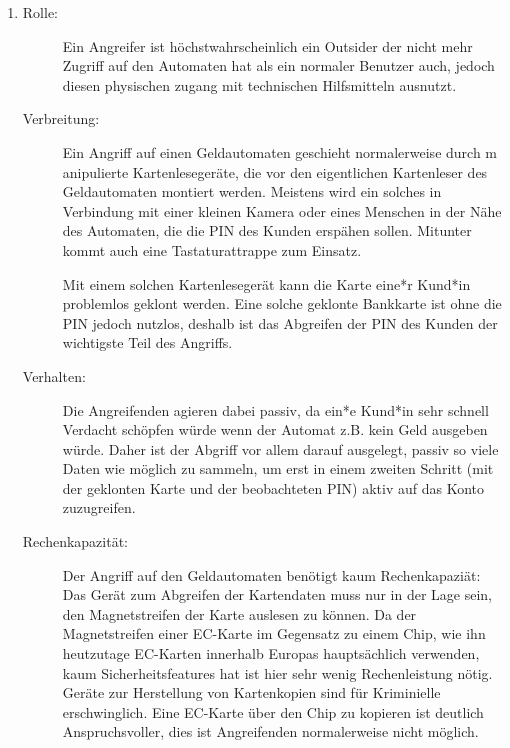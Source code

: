 \documentclass[a4paper,11pt]{scrartcl}
\begin{document}
\begin{enumerate}[1.]
    \item 
        \begin{description}
            \item[Rolle:]
                Ein Angreifer ist höchstwahrscheinlich ein Outsider der nicht 
                mehr Zugriff auf den Automaten hat als ein normaler Benutzer auch,
                jedoch diesen physischen zugang mit technischen Hilfsmitteln ausnutzt.
            \item[Verbreitung:]
                Ein Angriff auf einen Geldautomaten geschieht normalerweise durch m
                anipulierte Kartenlesegeräte, die vor den eigentlichen Kartenleser des 
                Geldautomaten montiert werden. Meistens wird ein solches in Verbindung 
                mit einer kleinen Kamera oder eines Menschen in der Nähe des Automaten, 
                die die PIN des Kunden erspähen sollen. Mitunter kommt auch eine 
                Tastaturattrappe zum Einsatz.

                Mit einem solchen Kartenlesegerät kann die Karte eine*r Kund*in problemlos 
                geklont werden. Eine solche geklonte Bankkarte ist ohne die PIN jedoch nutzlos, 
                deshalb ist das Abgreifen der PIN des Kunden der wichtigste Teil des Angriffs.
            \item[Verhalten:]
                Die Angreifenden agieren dabei passiv, da ein*e Kund*in sehr schnell Verdacht 
                schöpfen würde wenn der Automat z.B. kein Geld ausgeben würde. Daher ist 
                der Abgriff vor allem darauf ausgelegt, passiv so viele Daten wie möglich 
                zu sammeln, um erst in einem zweiten Schritt (mit der geklonten Karte und 
                der beobachteten PIN) aktiv auf das Konto zuzugreifen.
            \item[Rechenkapazität:]
            	Der Angriff auf den Geldautomaten benötigt kaum Rechenkapaziät: Das Gerät
            	zum Abgreifen der Kartendaten muss nur in der Lage sein, den Magnetstreifen der Karte
            	auslesen zu können. Da der Magnetstreifen einer EC-Karte im Gegensatz zu einem
            	Chip, wie ihn heutzutage EC-Karten innerhalb Europas hauptsächlich verwenden, kaum
            	Sicherheitsfeatures hat ist hier sehr wenig Rechenleistung nötig. Geräte zur
            	Herstellung von Kartenkopien sind für Kriminielle erschwinglich.
            	Eine EC-Karte über den Chip zu kopieren ist deutlich Anspruchsvoller, dies ist
            	Angreifenden normalerweise nicht möglich.

        \end{description}
\end{enumerate}
\end{document}
